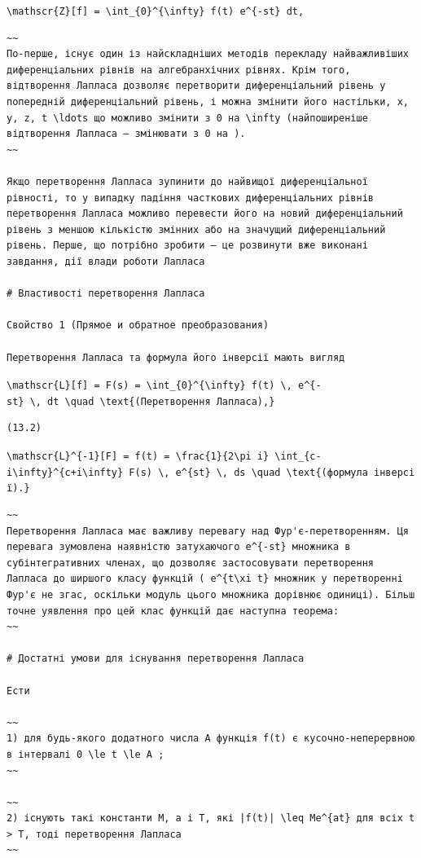 \documentclass[
  ukrainian,
]{article}
\begin{document}
\texttt{\textbackslash{}mathscr\{Z\}{[}f{]}\ =\ \textbackslash{}int\_\{0\}\^{}\{\textbackslash{}infty\}\ f(t)\ e\^{}\{-st\}\ dt,}

\begin{verbatim}
~~
По-перше, існує один із найскладніших методів перекладу найважливіших диференціальних рівнів на алгебранхічних рівнях. Крім того, відтворення Лапласа дозволяє перетворити диференціальний рівень у попередній диференціальний рівень, і можна змінити його настільки, x, y, z, t \ldots що можливо змінити з 0 на \infty (найпоширеніше відтворення Лапласа — змінювати з 0 на ).
~~

Якщо перетворення Лапласа зупинити до найвищої диференціальної рівності, то у випадку падіння часткових диференціальних рівнів перетворення Лапласа можливо перевести його на новий диференціальний рівень з меншою кількістю змінних або на значущий диференціальний рівень. Перше, що потрібно зробити — це розвинути вже виконані завдання, дії влади роботи Лапласа

# Властивості перетворення Лапласа

Свойство 1 (Прямое и обратное преобразования)

Перетворення Лапласа та формула його інверсії мають вигляд
\end{verbatim}

\texttt{\textbackslash{}mathscr\{L\}{[}f{]}\ =\ F(s)\ =\ \textbackslash{}int\_\{0\}\^{}\{\textbackslash{}infty\}\ f(t)\ \textbackslash{},\ e\^{}\{-st\}\ \textbackslash{},\ dt\ \textbackslash{}quad\ \textbackslash{}text\{(Перетворення\ Лапласа),\}}

\begin{verbatim}
(13.2)
\end{verbatim}

\texttt{\textbackslash{}mathscr\{L\}\^{}\{-1\}{[}F{]}\ =\ f(t)\ =\ \textbackslash{}frac\{1\}\{2\textbackslash{}pi\ i\}\ \textbackslash{}int\_\{c-i\textbackslash{}infty\}\^{}\{c+i\textbackslash{}infty\}\ F(s)\ \textbackslash{},\ e\^{}\{st\}\ \textbackslash{},\ ds\ \textbackslash{}quad\ \textbackslash{}text\{(формула\ інверсії).\}}

\begin{verbatim}
~~
Перетворення Лапласа має важливу перевагу над Фур'є-перетворенням. Ця перевага зумовлена наявністю затухаючого e^{-st} множника в субінтегративних членах, що дозволяє застосовувати перетворення Лапласа до ширшого класу функцій ( e^{t\xi t} множник у перетворенні Фур'є не згас, оскільки модуль цього множника дорівнює одиниці). Більш точне уявлення про цей клас функцій дає наступна теорема:
~~

# Достатні умови для існування перетворення Лапласа

Ести

~~
1) для будь-якого додатного числа A функція f(t) є кусочно-неперервною в інтервалі 0 \le t \le A ;
~~

~~
2) існують такі константи M, a і T, які |f(t)| \leq Me^{at} для всіх t > T, тоді перетворення Лапласа
~~
\end{verbatim}
\end{document}
